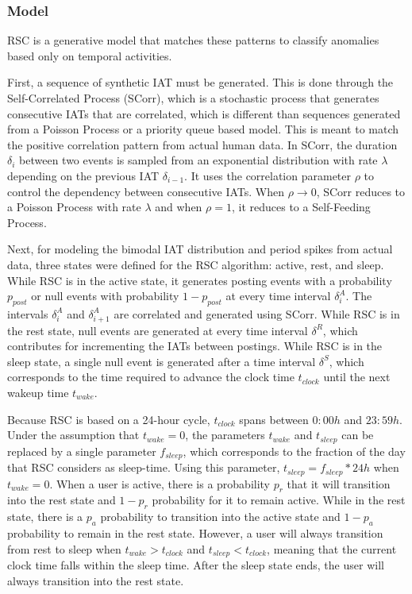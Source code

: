 \documentclass[11pt, oneside]{article}   	%
\begin{document}
\subsubsection*{Model}

\quad RSC is a generative model that matches these patterns to classify anomalies based only on temporal activities.

\quad First, a sequence of synthetic IAT must be generated.
This is done through the Self-Correlated Process (SCorr), which is a stochastic process that generates consecutive IATs that are correlated, which is different than sequences generated from a Poisson Process or a priority queue based model.
This is meant to match the positive correlation pattern from actual human data.
In SCorr, the duration $\delta_i$ between two events is sampled from an exponential distribution with rate $\lambda$ depending on the previous IAT $\delta_{i-1}$. It uses the correlation parameter $\rho$ to control the dependency between consecutive IATs. When $\rho \rightarrow 0$, SCorr reduces to a Poisson Process with rate $\lambda$ and when $\rho = 1$, it reduces to a Self-Feeding Process.

\quad Next, for modeling the bimodal IAT distribution and period spikes from actual data, three states were defined for the RSC algorithm: active, rest, and sleep.
While RSC is in the active state, it generates posting events with a probability $p_{post}$ or null events with probability $1-p_{post}$ at every time interval $\delta_i^A$.
The intervals $\delta_i^A$ and $\delta_{i+1}^A$ are correlated and generated using SCorr.
While RSC is in the rest state, null events are generated at every time interval $\delta^R$, which contributes for incrementing the IATs between postings.
While RSC is in the sleep state, a single null event is generated after a time interval $\delta^S$, which corresponds to the time required to advance the clock time $t_{clock}$ until the next wakeup time $t_{wake}$.

\quad Because RSC is based on a 24-hour cycle, $t_{clock}$ spans between $0:00h$ and $23:59h$.
Under the assumption that $t_{wake}=0$, the parameters $t_{wake}$ and $t_{sleep}$ can be replaced by a single parameter $f_{sleep}$, which corresponds to the fraction of the day that RSC considers as sleep-time.
Using this parameter, $t_{sleep}=f_{sleep}*24h$ when $t_{wake}=0$.
When a user is active, there is a probability $p_r$ that it will transition into the rest state and $1-p_r$ probability for it to remain active.
While in the rest state, there is a $p_a$ probability to transition into the active state and $1-p_a$ probability to remain in the rest state.
However, a user will always transition from rest to sleep when $t_{wake} > t_{clock}$ and $t_{sleep} < t_{clock}$, meaning that the current clock time falls within the sleep time.
After the sleep state ends, the user will always transition into the rest state.
\end{document}
